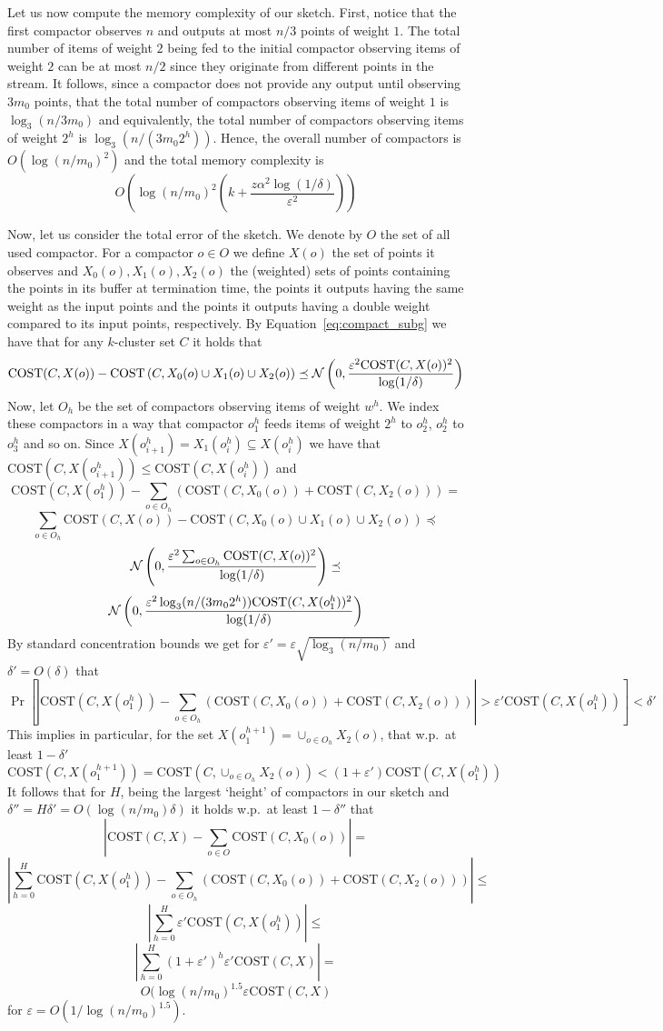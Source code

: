 \documentclass[11pt]{article}
\newcommand{\eps}{\varepsilon}
\newcommand{\cost}{\text{COST}}
\newcommand{\N}{{\cal N}}
\begin{document}
Let us now compute the memory complexity of our sketch. First, notice that the first compactor observes $n$ and outputs at most $n/3$ points of weight $1$. The total number of items of weight $2$ being fed to the initial compactor observing items of weight $2$ can be at most $n/2$ since they originate from different points in the stream. It follows, since a compactor does not provide any output until observing $3m_0$ points, that the total number of compactors observing items of weight $1$ is $\log_3(n/3m_0)$ and equivalently, the total number of compactors observing items of weight $2^h$ is $\log_3(n/(3m_0 2^h))$. Hence, the overall number of compactors is
$O(\log(n/m_0)^2)$ and the total memory complexity is
$$ O\left( \log(n/m_0)^2  \left( k+\frac{ z \alpha^2 \log(1/\delta)}{\eps^2} \right) \right) $$

Now, let us consider the total error of the sketch. We denote by $O$ the set of all used compactor. For a compactor $o \in O$ we define $X(o)$ the set of points it observes and $X_0(o), X_1(o), X_2(o)$ the (weighted) sets of points containing the points in its buffer at termination time, the points it outputs having the same weight as the input points and the points it outputs having a double weight compared to its input points, respectively. By Equation~\ref{eq:compact_subg} we have that for any $k$-cluster set $C$ it holds that
$$\cost(C,X(o)) -  \cost\left(C,X_0(o) \cup X_1(o) \cup X_2(o) \right) \preceq \N \left(0,\frac{\eps^2 \cost(C,X(o))^2}{  \log(1/\delta)} \right)$$
Now, let $O_h$ be the set of compactors observing items of weight $w^h$. We index these compactors in a way that compactor $o_1^h$ feeds items of weight $2^h$ to $o_2^h$, $o_2^h$ to $o_3^h$ and so on. Since $X(o^h_{i+1}) = X_1(o^h_i) \subseteq X(o^h_i)$ we have that $\cost(C,X(o^h_{i+1})) \leq \cost(C,X(o^h_i))$ and 
$$\cost(C,X(o^h_1)) - \sum_{o \in O_h} \left( \cost(C,X_0(o)) + \cost(C,X_2(o)) \right) = $$
$$ \sum_{o \in O_h} \cost(C,X(o)) -  \cost\left(C,X_0(o) \cup X_1(o) \cup X_2(o) \right) \preceq $$
$$ \N \left(0,\frac{\eps^2 \sum_{o \in O_h} \cost(C,X(o))^2}{  \log(1/\delta)} \right) \preceq $$
$$ \N \left(0,\frac{\eps^2 \log_3(n/(3m_0 2^h)) \cost(C,X(o^h_1))^2}{  \log(1/\delta)} \right)  $$
By standard concentration bounds we get for $\eps' = \eps \sqrt{\log_3(n/m_0)}$ and $\delta' = O(\delta)$ that
$$\Pr \left[ \left| \cost(C,X(o^h_1)) - \sum_{o \in O_h} \left( \cost(C,X_0(o)) + \cost(C,X_2(o)) \right) \right| >  \eps' \cost(C,X(o^h_1))\right]<\delta' $$
This implies in particular, for the set $X(o^{h+1}_1) = \cup_{o \in O_h}X_2(o)$, that w.p.\ at least $1-\delta'$
$$ \cost(C,X(o_1^{h+1})) = \cost(C,\cup_{o \in O_h}X_2(o)) < (1+\eps') \cost(C,X(o_1^h)) $$
It follows that for $H$, being the largest `height' of compactors in our sketch and $\delta'' = H\delta' = O(\log(n/m_0)\delta)$ it holds w.p.\ at least $1-\delta''$ that
$$ \left| \cost(C,X) - \sum_{o \in O} \cost(C,X_0(o)) \right| =$$
$$ \left| \sum_{h=0}^{H}  \cost(C,X(o^h_1)) - \sum_{o \in O_h} \left( \cost(C,X_0(o)) + \cost(C,X_2(o)) \right) \right| \leq$$
$$ \left| \sum_{h=0}^{H}  \eps' \cost(C,X(o^h_1)) \right| \leq$$
$$ \left| \sum_{h=0}^{H} (1+\eps')^h \eps' \cost(C,X) \right| =$$
$$ O(\log(n/m_0)^{1.5}\eps \cost(C,X) $$
for $\eps = O(1/\log(n/m_0)^{1.5})$.
\end{document}
